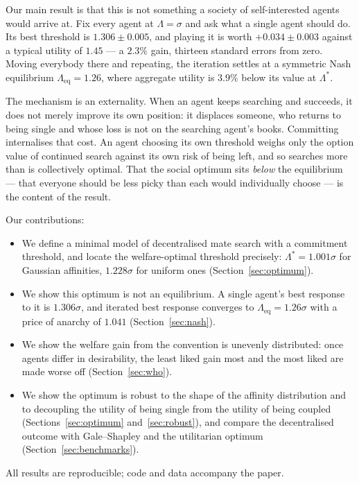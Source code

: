 \documentclass[sigconf,anonymous]{aamas}
\newcommand{\Leq}{\Lambda_{\mathrm{eq}}}
\newcommand{\Lopt}{\Lambda^\ast}
\begin{document}
Our main result is that this is not something a society of self-interested
agents would arrive at. Fix every agent at $\Lambda = \sigma$ and ask what a
single agent should do. Its best threshold is $1.306 \pm 0.005$, and playing it
is worth $+0.034 \pm 0.003$ against a typical utility of $1.45$ --- a $2.3\%$
gain, thirteen standard errors from zero. Moving everybody there and repeating,
the iteration settles at a symmetric Nash equilibrium
$\Leq = 1.26$, where aggregate utility is $3.9\%$ below its value at $\Lopt$.

The mechanism is an externality. When an agent keeps searching and succeeds, it
does not merely improve its own position: it displaces someone, who returns to
being single and whose loss is not on the searching agent's books. Committing
internalises that cost. An agent choosing its own threshold weighs only the
option value of continued search against its own risk of being left, and so
searches more than is collectively optimal. That the social optimum sits
\emph{below} the equilibrium --- that everyone should be less picky than each
would individually choose --- is the content of the result.

Our contributions:

\begin{itemize}
\item We define a minimal model of decentralised mate search with a commitment
threshold, and locate the welfare-optimal threshold precisely:
$\Lopt = 1.001\sigma$ for Gaussian affinities, $1.228\sigma$ for uniform ones
(Section~\ref{sec:optimum}).
\item We show this optimum is not an equilibrium. A single agent's best response
to it is $1.306\sigma$, and iterated best response converges to
$\Leq = 1.26\sigma$ with a price of anarchy of $1.041$
(Section~\ref{sec:nash}).
\item We show the welfare gain from the convention is unevenly distributed:
once agents differ in desirability, the least liked gain most and the most liked
are made worse off (Section~\ref{sec:who}).
\item We show the optimum is robust to the shape of the affinity distribution
and to decoupling the utility of being single from the utility of being coupled
(Sections~\ref{sec:optimum} and~\ref{sec:robust}), and compare the decentralised
outcome with Gale--Shapley and the utilitarian optimum
(Section~\ref{sec:benchmarks}).
\end{itemize}

All results are reproducible; code and data accompany the paper.
\end{document}
